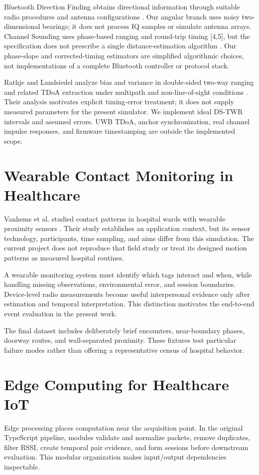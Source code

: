 \documentclass[12pt,a4paper]{report}
\begin{document}
Bluetooth Direction Finding obtains directional information through suitable radio procedures and antenna configurations \cite{ref3}. Our angular branch uses noisy two-dimensional bearings; it does not process IQ samples or simulate antenna arrays. Channel Sounding uses phase-based ranging and round-trip timing [4,5], but the specification does not prescribe a single distance-estimation algorithm \cite{ref4}. Our phase-slope and corrected-timing estimators are simplified algorithmic choices, not implementations of a complete Bluetooth controller or protocol stack.

Rathje and Landsiedel analyze bias and variance in double-sided two-way ranging and related TDoA extraction under multipath and non-line-of-sight conditions \cite{ref6}. Their analysis motivates explicit timing-error treatment; it does not supply measured parameters for the present simulator. We implement ideal DS-TWR intervals and assumed errors. UWB TDoA, anchor synchronization, real channel impulse responses, and firmware timestamping are outside the implemented scope.

\section{Wearable Contact Monitoring in Healthcare}
Vanhems et al. studied contact patterns in hospital wards with wearable proximity sensors \cite{ref1}. Their study establishes an application context, but its sensor technology, participants, time sampling, and aims differ from this simulation. The current project does not reproduce that field study or treat its designed motion patterns as measured hospital routines.

A wearable monitoring system must identify which tags interact and when, while handling missing observations, environmental error, and session boundaries. Device-level radio measurements become useful interpersonal evidence only after estimation and temporal interpretation. This distinction motivates the end-to-end event evaluation in the present work.

The final dataset includes deliberately brief encounters, near-boundary phases, doorway routes, and wall-separated proximity. These fixtures test particular failure modes rather than offering a representative census of hospital behavior.

\section{Edge Computing for Healthcare IoT}
Edge processing places computation near the acquisition point. In the original TypeScript pipeline, modules validate and normalize packets, remove duplicates, filter RSSI, create temporal pair evidence, and form sessions before downstream evaluation. This modular organization makes input/output dependencies inspectable.
\end{document}
